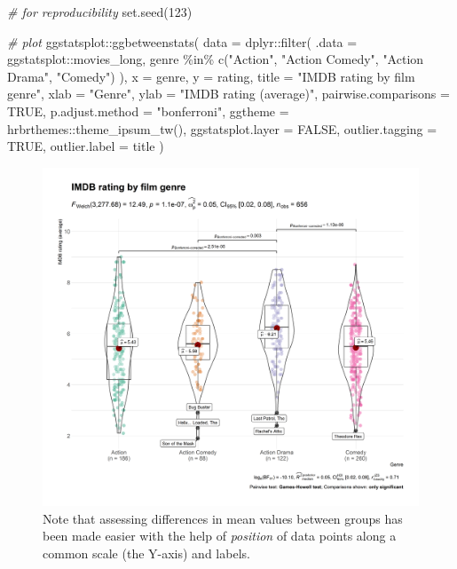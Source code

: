 \documentclass[
]{article}
\newenvironment{Shaded}{\begin{snugshade}}{\end{snugshade}}
\newcommand{\AttributeTok}[1]{\textcolor[rgb]{0.77,0.63,0.00}{#1}}
\newcommand{\CommentTok}[1]{\textcolor[rgb]{0.56,0.35,0.01}{\textit{#1}}}
\newcommand{\ConstantTok}[1]{\textcolor[rgb]{0.00,0.00,0.00}{#1}}
\newcommand{\DecValTok}[1]{\textcolor[rgb]{0.00,0.00,0.81}{#1}}
\newcommand{\FunctionTok}[1]{\textcolor[rgb]{0.00,0.00,0.00}{#1}}
\newcommand{\NormalTok}[1]{#1}
\newcommand{\SpecialCharTok}[1]{\textcolor[rgb]{0.00,0.00,0.00}{#1}}
\newcommand{\StringTok}[1]{\textcolor[rgb]{0.31,0.60,0.02}{#1}}
\begin{document}
\begin{Shaded}
\begin{Highlighting}[]
\CommentTok{\# for reproducibility}
\FunctionTok{set.seed}\NormalTok{(}\DecValTok{123}\NormalTok{)}

\CommentTok{\# plot}
\NormalTok{ggstatsplot}\SpecialCharTok{::}\FunctionTok{ggbetweenstats}\NormalTok{(}
  \AttributeTok{data =}\NormalTok{ dplyr}\SpecialCharTok{::}\FunctionTok{filter}\NormalTok{(}
    \AttributeTok{.data =}\NormalTok{ ggstatsplot}\SpecialCharTok{::}\NormalTok{movies\_long,}
\NormalTok{    genre }\SpecialCharTok{\%in\%} \FunctionTok{c}\NormalTok{(}\StringTok{"Action"}\NormalTok{, }\StringTok{"Action Comedy"}\NormalTok{, }\StringTok{"Action Drama"}\NormalTok{, }\StringTok{"Comedy"}\NormalTok{)}
\NormalTok{  ),}
  \AttributeTok{x =}\NormalTok{ genre,}
  \AttributeTok{y =}\NormalTok{ rating,}
  \AttributeTok{title =} \StringTok{"IMDB rating by film genre"}\NormalTok{,}
  \AttributeTok{xlab =} \StringTok{"Genre"}\NormalTok{,}
  \AttributeTok{ylab =} \StringTok{"IMDB rating (average)"}\NormalTok{,}
  \AttributeTok{pairwise.comparisons =} \ConstantTok{TRUE}\NormalTok{,}
  \AttributeTok{p.adjust.method =} \StringTok{"bonferroni"}\NormalTok{,}
  \AttributeTok{ggtheme =}\NormalTok{ hrbrthemes}\SpecialCharTok{::}\FunctionTok{theme\_ipsum\_tw}\NormalTok{(),}
  \AttributeTok{ggstatsplot.layer =} \ConstantTok{FALSE}\NormalTok{,}
  \AttributeTok{outlier.tagging =} \ConstantTok{TRUE}\NormalTok{,}
  \AttributeTok{outlier.label =}\NormalTok{ title}
\NormalTok{)}
\end{Highlighting}
\end{Shaded}

\begin{figure}[H]
\includegraphics[width=1\linewidth]{./figures/paper-fig1-1} \caption{Note that assessing differences in mean values between groups has been made easier with the help of \textit{position} of data points along a common scale (the Y-axis) and labels.}\label{fig:fig1}
\end{figure}
\end{document}
